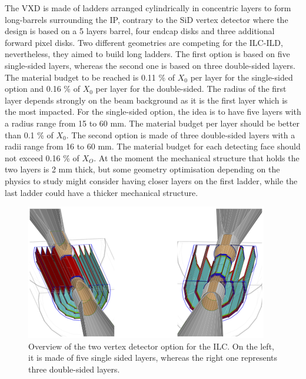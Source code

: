    The \gls{VXD} is made of ladders arranged cylindrically in concentric layers to form long-barrels surrounding the \gls{IP}, contrary to the \gls{SiD} vertex detector where the design is based on a 5 layers barrel, four endcap disks and three additional forward pixel disks.
   Two different geometries are competing for the \gls{ILC}-{ILD}, nevertheless, they aimed to build long ladders. 
   The first option is based on five single-sided layers, whereas the second one is based on three double-sided layers.
   The material budget to be reached is 0.11 \% of $X_0$ per layer for the single-sided option and 0.16 \% of $X_0$ per layer for the double-sided.
   The radius of the first layer depends strongly on the beam background as it is the first layer which is the most impacted.
   For the single-sided option, the idea is to have five layers with a radius range from 15 to 60 mm.
   The material budget per layer should be better than 0.1 \% of $X_0$.
   The second option is made of three double-sided layers with a radii range from 16 to 60 mm.
   The material budget for each detecting face should not exceed 0.16 \% of $X_O$.
   At the moment the mechanical structure that holds the two layers is 2 mm thick, but some geometry optimisation depending on the physics to study might consider having closer layers on the first ladder, while the last ladder could have a thicker mechanical structure.
   
   \begin{figure}[!h]
     \centering
     \includegraphics[width = 10 cm]{Pictures/vxd/ild_VXD.png}
     \caption{Overview of the two vertex detector option for the ILC. On the left, it is made of five single sided layers, whereas the right one represents three double-sided layers.}
   \end{figure}
   

